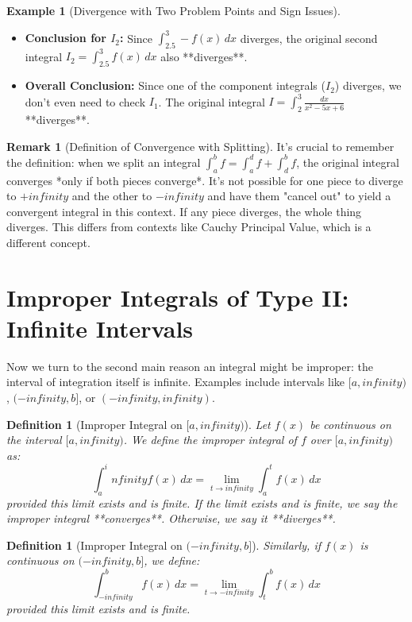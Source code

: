 \documentclass[11pt]{article}
\def\infty{infinity}%
\newtheorem{definition}[theorem]{Definition}
\theoremstyle{definition}
\newtheorem{example}[theorem]{Example}
\newtheorem{remark}[theorem]{Remark}
\newcommand{\dx}{\, dx} %
\begin{document}
\begin{example}[Divergence with Two Problem Points and Sign Issues]
\begin{itemize}
          Since $L=1$ (finite and positive) and $\int_{2.5}^3 g(x) \dx$ diverges, the LCT tells us that $\int_{2.5}^3 h(x) \dx = \int_{2.5}^3 \frac{1}{(x-2)(3-x)} \dx$ **diverges**.
        \item \textbf{Conclusion for $I_2$:} Since $\int_{2.5}^3 -f(x) \dx$ diverges, the original second integral $I_2 = \int_{2.5}^3 f(x) \dx$ also **diverges**.        \item \textbf{Overall Conclusion:} Since one of the component integrals ($I_2$) diverges, we don't even need to check $I_1$. The original integral $I = \int_2^3 \frac{dx}{x^2 - 5x + 6}$ **diverges**.
    \end{itemize}
\end{example}

\begin{remark}[Definition of Convergence with Splitting]
    It's crucial to remember the definition: when we split an integral $\int_a^b f = \int_a^d f + \int_d^b f$, the original integral converges *only if both pieces converge*. It's not possible for one piece to diverge to $+\infty$ and the other to $-\infty$ and have them "cancel out" to yield a convergent integral in this context. If any piece diverges, the whole thing diverges. This differs from contexts like Cauchy Principal Value, which is a different concept.
\end{remark}

\section{Improper Integrals of Type II: Infinite Intervals}

Now we turn to the second main reason an integral might be improper: the interval of integration itself is infinite. Examples include intervals like $[a, \infty)$, $(-\infty, b]$, or $(-\infty, \infty)$.

\begin{definition}[Improper Integral on $[a, \infty)$]
    Let $f(x)$ be continuous on the interval $[a, \infty)$. We define the improper integral of $f$ over $[a, \infty)$ as:
    \[
    \int_a^\infty f(x) \dx = \lim_{t \to \infty} \int_a^t f(x) \dx
    \]
    provided this limit exists and is finite. If the limit exists and is finite, we say the improper integral **converges**. Otherwise, we say it **diverges**.
\end{definition}

\begin{definition}[{Improper Integral on $(-\infty, b]$}]
    Similarly, if $f(x)$ is continuous on $(-\infty, b]$, we define:
    \[
    \int_{-\infty}^b f(x) \dx = \lim_{t \to -\infty} \int_t^b f(x) \dx
    \]
    provided this limit exists and is finite.
\end{definition}
\end{document}
